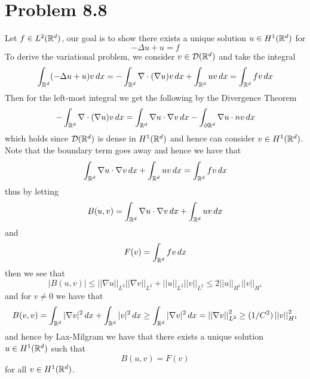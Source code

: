 \documentclass[12pt]{report}
\newcommand{\norm}[1]{\left|\left|#1\right|\right|}
\begin{document}
\section*{Problem 8.8}
Let $f \in L^2(\mathbb{R}^d)$, our goal is to show there exists a unique solution $u \in H^1(\mathbb{R}^d)$ for 
\begin{equation*}
  -\Delta u + u = f
\end{equation*}
To derive the variational problem, we consider $v \in \mathcal{D}(\mathbb{R}^d)$ and take the integral
\begin{equation*}
  \int_{\mathbb{R}^d} (-\Delta u + u)v \, dx = -\int_{\mathbb{R}^d} \nabla \cdot (\nabla u)v \,dx + \int_{\mathbb{R}^d} uv \,dx =   \int_{\mathbb{R}^d} fv \, dx
\end{equation*}
Then for the left-most integral we get the following by the Divergence Theorem
\begin{equation*}
  -\int_{\mathbb{R}^d} \nabla \cdot (\nabla u) v \,dx = \int_{\mathbb{R}^d} \nabla u \cdot \nabla v \, dx - \int_{\partial \mathbb{R}^d} \nabla u \cdot n v \, dx
\end{equation*}
which holds since $\mathcal{D}(\mathbb{R}^d)$ is dense in $H^1(\mathbb{R}^d)$ and hence can consider $v \in H^1(\mathbb{R}^d)$. Note that the boundary term goes away and hence we have that
\begin{equation*}
  \int_{\mathbb{R}^d} \nabla u \cdot \nabla v \,dx + \int_{\mathbb{R}^d} uv \, dx = \int_{\mathbb{R}^d} fv \, dx
\end{equation*}
thus by letting
\begin{equation*}
  B(u,v) =\int_{\mathbb{R}^d} \nabla u \cdot \nabla v \,dx + \int_{\mathbb{R}^d} uv \, dx  
\end{equation*}
and 
\begin{equation*}
  F(v) = \int_{\mathbb{R}^d} fv \, dx
\end{equation*}
then we see that
\begin{equation*}
  |B(u,v)| \leq \norm{\nabla u}_{L^2} \norm{\nabla v}_{L^2} + \norm{u}_{L^2} \norm{v}_{L^2} \leq 2 \norm{u}_{H^1} \norm{v}_{H^1}
\end{equation*}
and for $v \neq 0$ we have that
\begin{equation*}
  B(v,v) = \int_{\R^d} |\nabla v|^2 \,dx + \int_{\R^d} |v|^2 \,dx \geq \int_{\R^d} |\nabla v|^2 \, dx = \norm{\nabla v}^2_{L^2} \geq (1/C^2) \norm{v}^2_{H^1}
\end{equation*}
and hence by Lax-Milgram we have that there exists a unique solution $u \in H^1(\mathbb{R}^d)$ such that 
\begin{equation*}
  B(u,v) = F(v)
\end{equation*}
for all $v \in H^1(\mathbb{R}^d)$.
\end{document}

